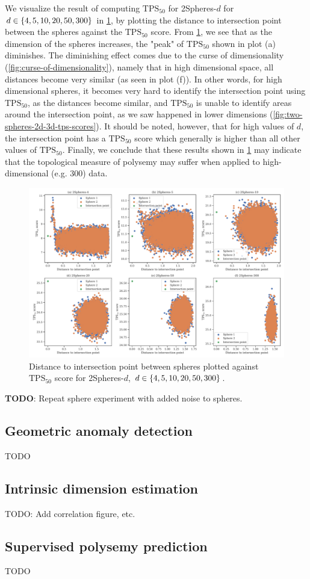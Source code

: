 We visualize the result of computing $\text{TPS}_{50}$ for 2Spheres-$d$ for $d \in \left\{4, 5, 10, 20, 50, 300\right\}$ in \cref{fig:two-spheres-distance-to-int-point-vs-tps-scores}, by plotting the distance to intersection point between the spheres against the $\text{TPS}_{50}$ score. From \cref{fig:two-spheres-distance-to-int-point-vs-tps-scores}, we see that as the dimension of the spheres increases, the "peak" of $\text{TPS}_{50}$ shown in plot (a) diminishes. The diminishing effect comes due to the curse of dimensionality (\cref{fig:curse-of-dimensionality}), namely that in high dimensional space, all distances become very similar (as seen in plot (f)). In other words, for high dimensional spheres, it becomes very hard to identify the intersection point using $\text{TPS}_{50}$, as the distances become similar, and $\text{TPS}_{50}$ is unable to identify areas around the intersection point, as we saw happened in lower dimensions (\cref{fig:two-spheres-2d-3d-tps-scores}). It should be noted, however, that for high values of $d$, the intersection point has a $\text{TPS}_{50}$ score which generally is higher than all other values of $\text{TPS}_{50}$. Finally, we conclude that these results shown in \cref{fig:two-spheres-distance-to-int-point-vs-tps-scores} may indicate that the topological measure of polysemy may suffer when applied to high-dimensional (e.g. 300) data.
\begin{figure}[H]
    \centering
    \includegraphics[width=\textwidth]{thesis/figures/two-spheres-distance-to-int-point-vs-tps-scores.pdf}
    \caption{Distance to intersection point between spheres plotted against $\text{TPS}_{50}$ score for 2Spheres-$d$, $d \in \left\{4, 5, 10, 20, 50, 300\right\}$.}
    \label{fig:two-spheres-distance-to-int-point-vs-tps-scores}
\end{figure}

\textbf{TODO}: Repeat sphere experiment with added noise to spheres.

\subsection{Geometric anomaly detection}
TODO

\subsection{Intrinsic dimension estimation}
TODO: Add correlation figure, etc.

\subsection{Supervised polysemy prediction}
TODO